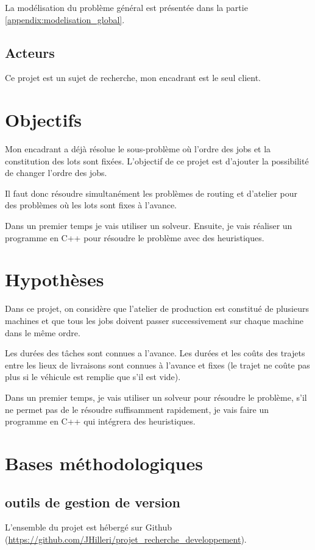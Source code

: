 La modélisation du problème général est présentée dans la partie \autoref{appendix:modelisation_global}.

\subsection{Acteurs}
Ce projet est un sujet de recherche, mon encadrant est le seul client.

\section{Objectifs}
Mon encadrant a déjà résolue le sous-problème où l'ordre des jobs et la constitution des lots sont fixées.
L'objectif de ce projet est d'ajouter la possibilité de changer l'ordre des jobs.

Il faut donc résoudre simultanément les problèmes de routing et d'atelier pour des problèmes où les lots sont fixes à l'avance.

Dans un premier temps je vais utiliser un solveur.
Ensuite, je vais réaliser un programme en C++ pour résoudre le problème avec des heuristiques.

\section{Hypothèses}
Dans ce projet, on considère que l'atelier de production est constitué de plusieurs machines 
    et que tous les jobs doivent passer successivement sur chaque machine dans le même ordre.

Les durées des tâches sont connues a l'avance.
Les durées et les coûts des trajets entre les lieux de livraisons sont connues à l'avance 
    et fixes (le trajet ne coûte pas plus si le véhicule est remplie que s'il est vide).

Dans un premier temps, je vais utiliser un solveur pour résoudre le problème, 
    s'il ne permet pas de le résoudre suffisamment rapidement, 
    je vais faire un programme en C++ qui intégrera des heuristiques.

\section{Bases méthodologiques}
\subsection{outils de gestion de version}
L'ensemble du projet est hébergé sur Github (\url{https://github.com/JHilleri/projet_recherche_developpement}).

